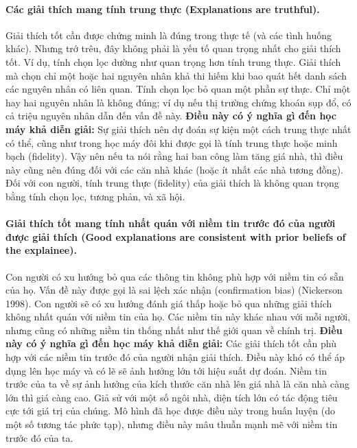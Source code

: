 \paragraph{Các giải thích mang tính trung thực (Explanations are truthful).} Giải thích tốt cần được chứng minh là đúng trong thực tế (và các tình huống khác). Nhưng trớ trêu, đây không phải là yếu tố quan trọng nhất cho giải thích tốt. Ví dụ, tính chọn lọc dường như quan trọng hơn tính trung thực. Giải thích mà chọn chỉ một hoặc hai nguyên nhân khả thi hiếm khi bao quát hết danh sách các nguyên nhân có liên quan. Tính chọn lọc bỏ quan một phần sự thực. Chỉ một hay hai nguyên nhân là không đúng; ví dụ nếu thị trường chứng khoán sụp đổ, có cả triệu nguyên nhân dẫn đến vấn đề này.
\textbf{Điều này có ý nghĩa gì đến học máy khả diễn giải:} Sự giải thích nên dự đoán sự kiện một cách trung thực nhất có thể, cũng như trong học máy đôi khi được gọi là tính trung thực hoặc minh bạch (fidelity). Vậy nên nếu ta nói rằng hai ban công làm tăng giá nhà, thì điều này cũng nên đúng đối với các căn nhà khác (hoặc ít nhất các nhà tương đồng). Đối với con người, tính trung thực (fidelity) của giải thích là không quan trọng bằng tính chọn lọc, tương phản, và xã hội. 

\paragraph{Giải thích tốt mang tính nhất quán với niềm tin trước đó của người được giải thích (Good explanations are consistent with prior beliefs of the explainee).} Con người có xu hướng bỏ qua các thông tin không phù hợp với niềm tin có sẵn của họ. Vấn đề này được gọi là sai lệch xác nhận (confirmation bias) (Nickerson 1998). Con người sẽ có xu hướng đánh giá thấp hoặc bỏ qua những giải thích không nhất quán với niềm tin của họ. Các niềm tin này khác nhau với mỗi người, nhưng cũng có những niềm tin thống nhất như thế giới quan về chính trị.
\textbf{Điều này có ý nghĩa gì đến học máy khả diễn giải:} Các giải thích tốt cần phù hợp với các niềm tin trước đó của người nhận giải thích. Điều này khó có thể áp dụng lên học máy và có lẽ sẽ ảnh hưởng lớn tới hiệu suất dự đoán. Niềm tin trước của ta về sự ảnh hưởng của kích thước căn nhà lên giá nhà là căn nhà càng lớn thì giá càng cao. Giả sử với một số ngôi nhà, diện tích lớn có tác động tiêu cực tới giá trị của chúng. Mô hình đã học được điều này trong huấn luyện (do một số tương tác phức tạp), nhưng điều này mâu thuẫn mạnh mẽ với niềm tin trước đó của ta.

